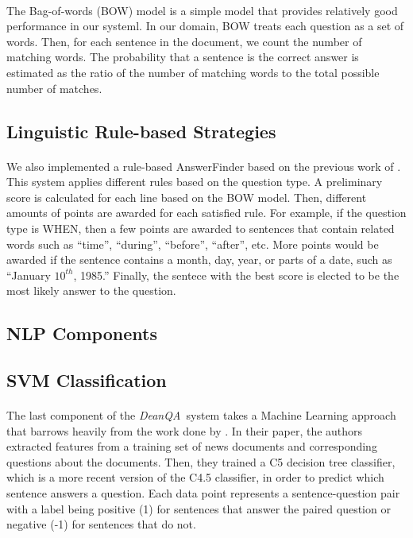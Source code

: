 \documentclass[11pt,letterpaper]{article}
\newcommand{\name}{\emph{DeanQA~}}
\begin{document}
\paragraph{}
The Bag-of-words (BOW) model is a simple model that provides
relatively good performance in our systeml. In our domain, BOW treats
each question as a set of words. Then, for each sentence in the
document, we count the number of matching words. The probability that
a sentence is the correct answer is estimated as the ratio of the
number of matching words to the total possible number of matches.

\subsection{Linguistic Rule-based Strategies}
\paragraph{}
We also implemented a rule-based AnswerFinder based on the previous
work of \cite{riloff2000}. This system applies different rules based
on the question type. A preliminary score is calculated for each line
based on the BOW model. Then, different amounts of points are awarded
for each satisfied rule. For example, if the question type is WHEN,
then a few points are awarded to sentences that contain related words
such as ``time'', ``during'', ``before'', ``after'', etc. More points
would be awarded if the sentence contains a month, day, year, or parts
of a date, such as ``January $10^{th}$, 1985.'' Finally, the sentece
with the best score is elected to be the most likely answer to the
question.

\subsection{NLP Components}


\subsection{SVM Classification}
\paragraph{}
The last component of the \name system takes a Machine Learning
approach that barrows heavily from the work done by
\cite{Ng00amachine}.  In their paper, the authors extracted features
from a training set of news documents and corresponding questions
about the documents.  Then, they trained a C5 decision tree
classifier, which is a more recent version of the C4.5
\cite{Quinlan:1993:CPM:152181} classifier, in order to predict which
sentence answers a question.  Each data point represents a
sentence-question pair with a label being positive (1) for sentences
that answer the paired question or negative (-1) for sentences that do
not.
\end{document}
